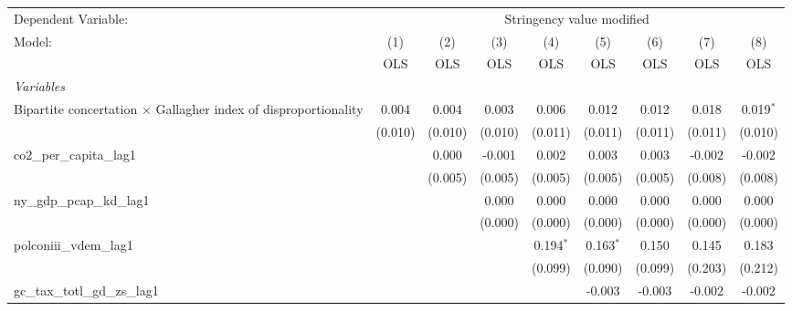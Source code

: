 
\begingroup
\centering
\begin{tabular}{lcccccccc}
   \toprule
   Dependent Variable: & \multicolumn{8}{c}{Stringency value modified}\\
   Model:                                                                 & (1)     & (2)     & (3)     & (4)         & (5)         & (6)     & (7)          & (8)\\  
                                                                          &  OLS    & OLS     & OLS     & OLS         & OLS         & OLS     & OLS          & OLS\\  
   \midrule
   \emph{Variables}\\
   Bipartite concertation $\times$ Gallagher index of disproportionality  & 0.004   & 0.004   & 0.003   & 0.006       & 0.012       & 0.012   & 0.018        & 0.019$^{*}$\\   
                                                                          & (0.010) & (0.010) & (0.010) & (0.011)     & (0.011)     & (0.011) & (0.011)      & (0.010)\\   
   co2\_per\_capita\_lag1                                                 &         & 0.000   & -0.001  & 0.002       & 0.003       & 0.003   & -0.002       & -0.002\\   
                                                                          &         & (0.005) & (0.005) & (0.005)     & (0.005)     & (0.005) & (0.008)      & (0.008)\\   
   ny\_gdp\_pcap\_kd\_lag1                                                &         &         & 0.000   & 0.000       & 0.000       & 0.000   & 0.000        & 0.000\\   
                                                                          &         &         & (0.000) & (0.000)     & (0.000)     & (0.000) & (0.000)      & (0.000)\\   
   polconiii\_vdem\_lag1                                                  &         &         &         & 0.194$^{*}$ & 0.163$^{*}$ & 0.150   & 0.145        & 0.183\\   
                                                                          &         &         &         & (0.099)     & (0.090)     & (0.099) & (0.203)      & (0.212)\\   
   gc\_tax\_totl\_gd\_zs\_lag1                                            &         &         &         &             & -0.003      & -0.003  & -0.002       & -0.002\\   

\end{tabular}
